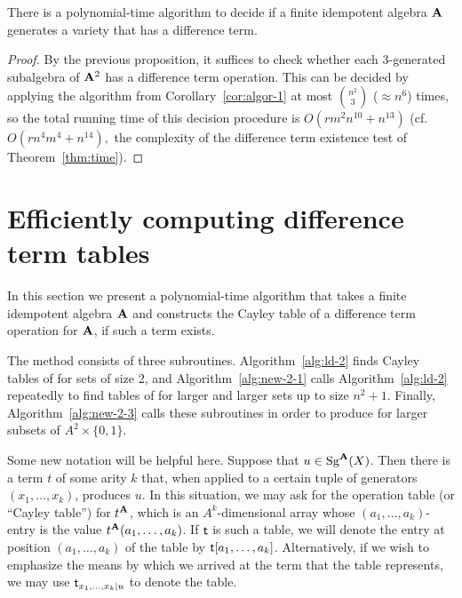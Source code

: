 \begin{corollary}
  There is a polynomial-time algorithm to decide if a finite idempotent algebra $\mathbf{A}$ generates a variety that has a difference term.
\end{corollary}

\begin{proof}
  By the previous proposition, it suffices to check whether each 3-generated subalgebra of
  $\mathbf{A}^2$ has a difference term operation. This can be decided by applying the
  algorithm from Corollary~\ref{cor:algor-1} at most $\binom{n^2}{3}$ ($\approx n^6$) times,
  so the total running time of this decision procedure is $O(rm^2n^{10} + n^{13})$ (cf.~$O(rn^4m^4 + n^{14}),$
  the complexity of the difference term existence test of Theorem~\ref{thm:time}).
\end{proof}

\section{Efficiently computing difference term tables}
\label{sec:comp-diff-term}
In this section we present a polynomial-time algorithm that takes
a finite idempotent algebra $\mathbf{A}$ and constructs the Cayley table of
a difference term operation for $\mathbf{A}$, if such a term exists.

The method consists of three subroutines.
Algorithm~\ref{alg:ld-2} finds Cayley tables of \ldtos for sets of size 2,
and Algorithm~\ref{alg:new-2-1} calls Algorithm~\ref{alg:ld-2} repeatedly to find
tables of \ldtos for larger and larger sets up to size $n^2+1$.
Finally, Algorithm~\ref{alg:new-2-3}
calls these subroutines in order to produce \ldtos for larger subsets of
$A^2 \times \{0,1\}$.

Some new notation will be helpful here.  Suppose that $ u \in \operatorname{Sg}^{\mathbf{A}}(X)$.
Then there is a term $t$ of some arity $k$ that, when applied to a certain tuple of
generators $(x_1, \dots, x_k)$, produces $u$.
In this situation, we may ask for the operation table (or ``Cayley table'')
for $t^{\mathbf{A}}$, which is an $A^k$-dimensional array whose $(a_1, \dots, a_k)$-entry
is the value $t^{\mathbf{A}}(a_1, \dots, a_k)$.
If $\mathsf{t}$ is such a table, we will denote the
entry at position $(a_1, \dots, a_k)$ of the table by $\mathsf{t}[a_1, \dots, a_k]$.
Alternatively, if we wish to emphasize the means by which
we arrived at the term that the table represents, we may use
$\mathsf{t}_{x_1,\dots, x_k \mid u}$ to denote the table.

